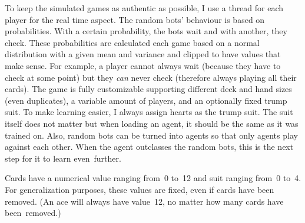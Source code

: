 \documentclass[a4paper,titlepage]{article}
\begin{document}
To keep the simulated games as authentic as possible, I use a thread for each player for the real time aspect. The random bots' behaviour is based on probabilities. With a certain probability, the bots wait and with another, they check. These probabilities are calculated each game based on a normal distribution with a given mean and variance and clipped to have values that make sense. For example, a player cannot always wait (because they have to check at some point) but they \emph{can} never check (therefore always playing all their cards). The game is fully customizable supporting different deck and hand sizes (even duplicates), a variable amount of players, and an optionally fixed trump suit. To make learning easier, I always assign hearts as the trump suit. The suit itself does not matter but when loading an agent, it should be the same as it was trained on. Also, random bots can be turned into agents so that only agents play against each other. When the agent outclasses the random bots, this is the next step for it to learn even~further.

Cards have a numerical value ranging from~0 to~12 and suit ranging from~0 to~4. For generalization purposes, these values are fixed, even if cards have been removed. (An ace will always have value~12, no matter how many cards have been~removed.) \medskip
\end{document}
